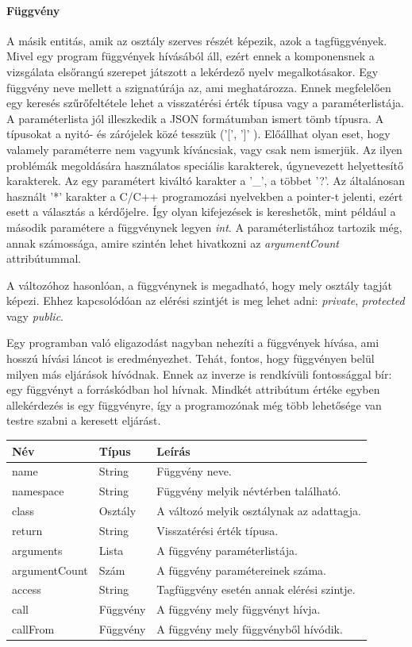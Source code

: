 \documentclass[a4paper,12pt]{report}
\begin{document}
\paragraph{Függvény}
A másik entitás, amik az osztály szerves részét képezik, azok a tagfüggvények. Mivel egy program függvények hívásából áll, ezért ennek a komponensnek a vizsgálata elsőrangú szerepet játszott a lekérdező nyelv megalkotásakor. Egy függvény neve mellett a szignatúrája az, ami meghatározza. Ennek megfelelően egy keresés szűrőfeltétele lehet a visszatérési érték típusa vagy a paraméterlistája. A paraméterlista jól illeszkedik a JSON formátumban ismert tömb típusra. A típusokat a nyitó- és zárójelek közé tesszük ('[', ']' ). Előállhat olyan eset, hogy valamely paraméterre nem vagyunk kíváncsiak, vagy csak nem ismerjük. Az ilyen problémák megoldására használatos speciális karakterek, úgynevezett helyettesítő karakterek. Az egy paramétert kiváltó karakter a '\_', a többet '?'. Az általánosan használt '*' karakter a C/C++ programozási nyelvekben a pointer-t jelenti, ezért esett a választás a kérdőjelre. Így olyan kifejezések is kereshetők, mint például a második paramétere a függvénynek legyen \textit{int}. A paraméterlistához tartozik még, annak számossága, amire szintén lehet hivatkozni az \textit{argumentCount} attribútummal.
\par A változóhoz hasonlóan, a függvénynek is megadható, hogy mely osztály tagját képezi. Ehhez kapcsolódóan az elérési szintjét is meg lehet adni: \textit{private}, \textit{protected} vagy \textit{public}.
\par Egy programban való eligazodást nagyban nehezíti a függvények hívása, ami hosszú hívási láncot is eredményezhet. Tehát, fontos, hogy függvényen belül milyen más eljárások hívódnak. Ennek az inverze is rendkívüli fontossággal bír: egy függvényt a forráskódban hol hívnak. Mindkét attribútum értéke egyben allekérdezés is egy függvényre, így a programozónak még több lehetősége van testre szabni a keresett eljárást.
\begin{center}
	\begin{tabular}{| l | l | l |}
		\hline
		Név & Típus & Leírás \\ \hline
		name & String & Függvény neve. \\ \hline
		namespace & String & Függvény melyik névtérben található. \\ \hline
		class & Osztály & A változó melyik osztálynak az adattagja. \\ \hline
		return & String & Visszatérési érték típusa. \\ \hline
		arguments & Lista & A függvény paraméterlistája. \\ \hline
		argumentCount & Szám & A függvény paramétereinek száma. \\ \hline
		access & String & Tagfüggvény esetén annak elérési szintje. \\ \hline
		call & Függvény & A függvény mely függvényt hívja. \\ \hline
		callFrom & Függvény & A függvény mely függvényből hívódik. \\ \hline
	\end{tabular}
\end{center}
\end{document}
